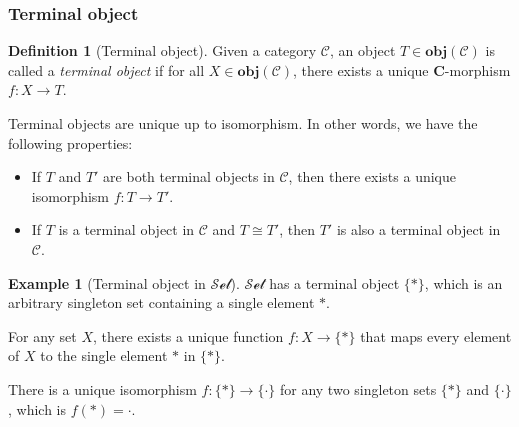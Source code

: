 \documentclass[12pt,twoside,a4paper]{report}
\theoremstyle{definition}
\newtheorem{definition}{Definition}
\theoremstyle{definition}
\theoremstyle{definition}
\newtheorem{example}{Example}
\theoremstyle{definition}
\begin{document}
            \subsubsection{Terminal object}
            \begin{definition}[Terminal object]
                Given a category $\mathcal{C}$, an object $T \in \textbf{obj}(\mathcal{C})$ is called a \emph{terminal object} if for all $X \in \textbf{obj}(\mathcal{C})$, there exists a unique \textbf{C}-morphism $f : X \to T$.
            \end{definition}
            Terminal objects are unique up to isomorphism. In other words, we have the following properties:
            \begin{itemize}
                \item 
                    If $T$ and $T'$ are both terminal objects in $\mathcal{C}$, then there exists a unique isomorphism $f : T \to T'$.
                \item
                    If $T$ is a terminal object in $\mathcal{C}$ and $T \cong T'$, then $T'$ is also a terminal object in $\mathcal{C}$.
            \end{itemize}
            \begin{example}[Terminal object in $\mathcal{Set}$]
                $\mathcal{Set}$ has a terminal object $\{\ast\}$, which is an arbitrary singleton set containing a single element $\ast$.

                For any set $X$, there exists a unique function $f : X \to \{\ast\}$ that maps every element of $X$ to the single element $\ast$ in $\{\ast\}$.
                
                There is a unique isomorphism $f : \{\ast\} \to \{\cdot\}$ for any two singleton sets $\{\ast\}$ and $\{\cdot\}$, which is $f(\ast) = \cdot$.
            \end{example}

            
\end{document}
